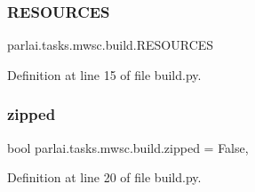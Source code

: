 \subsubsection{\texorpdfstring{R\+E\+S\+O\+U\+R\+C\+ES}{RESOURCES}}
{\footnotesize\ttfamily parlai.\+tasks.\+mwsc.\+build.\+R\+E\+S\+O\+U\+R\+C\+ES}



Definition at line 15 of file build.\+py.

\mbox{\label{namespaceparlai_1_1tasks_1_1mwsc_1_1build_aa47e77bae482dfa924fdb05fd14084fd}} 
\subsubsection{\texorpdfstring{zipped}{zipped}}
{\footnotesize\ttfamily bool parlai.\+tasks.\+mwsc.\+build.\+zipped = False,}



Definition at line 20 of file build.\+py.

